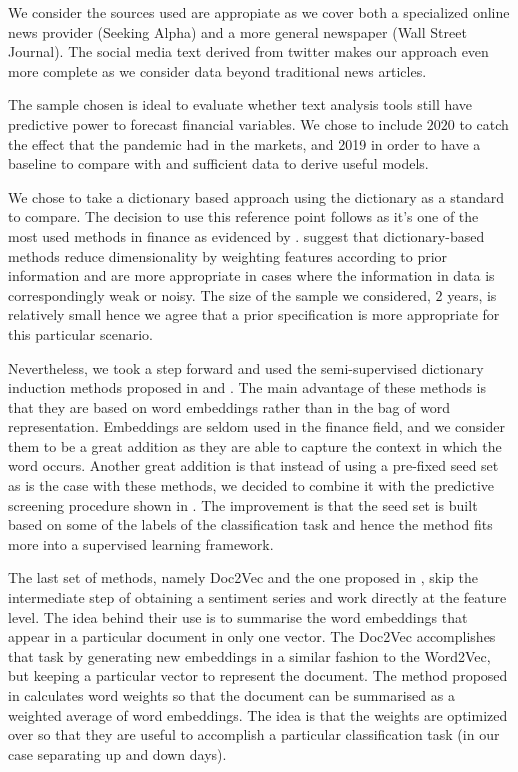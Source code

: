 \documentclass[a4paper, 12pt]{report}
\begin{document}
    We consider the sources used are appropiate as we cover both a specialized online news provider (Seeking Alpha) and a more general newspaper (Wall Street Journal). The social media text derived from twitter makes our approach even more complete as we consider data beyond traditional news articles. 
    
    The sample chosen is ideal to evaluate whether text analysis tools still have predictive power to forecast financial variables. We chose to include $2020$ to catch the effect that the pandemic had in the markets, and 2019 in order to have a baseline to compare with and sufficient data to derive useful models.  
    
    We chose to take a dictionary based approach using the \textcite{Loughran:2011} dictionary as a standard to compare. The decision to use this reference point follows as it's one of the most used methods in finance as evidenced by \textcite{Nassirtoussi:2014}. \textcite{Gentzkow:2019} suggest that dictionary-based methods reduce dimensionality by weighting features according to prior information and are more appropriate in cases where the information in data is correspondingly weak or noisy. The size of the sample we considered, $2$ years, is relatively small hence we agree that a prior specification is more appropriate for this particular scenario. 
    
    Nevertheless, we took a step forward and used the semi-supervised dictionary induction methods proposed in \textcite{An:2018} and \textcite{Hamilton:2016}. The main advantage of these methods is that they are based on word embeddings rather than in the bag of word representation. Embeddings are seldom used in the finance field, and we consider them to be a great addition as they are able to capture the context in which the word occurs. Another great addition is that instead of using a pre-fixed seed set as is the case with these methods, we decided to combine it with the predictive screening procedure shown in \textcite{Ke:2019}. The improvement is that the seed set is built based on some of the labels of the classification task and hence the method fits more into a supervised learning framework. 
    
    The last set of methods, namely Doc2Vec and the one proposed in \textcite{Gupta:2020}, skip the intermediate step of obtaining a sentiment series and work directly at the feature level. The idea behind their use is to summarise the word embeddings that appear in a particular document in only one vector. The Doc2Vec accomplishes that task by generating new embeddings in a similar fashion to the Word2Vec, but keeping a particular vector to represent the document. The method proposed in \textcite{Gupta:2020} calculates word weights so that the document can be summarised as a weighted average of word embeddings. The idea is that the weights are optimized over so that they are useful to accomplish a particular classification task (in our case separating up and down days). 
    
\end{document}

